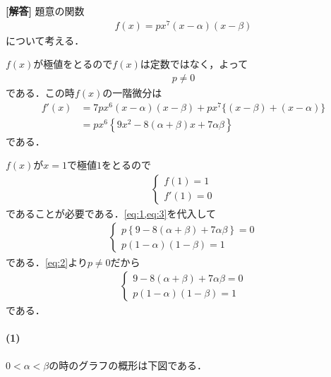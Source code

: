 \documentclass[../../main.tex]{subfiles}
\begin{document}
\begin{oframed}
  
\end{oframed}

{\bf [解答]}
題意の関数
\begin{align}
  f(x) = px^7(x-\alpha)(x-\beta) \label{eq:1}
\end{align}
について考える．

$f(x)$が極値をとるので$f(x)$は定数ではなく，よって
\begin{align}
  p \neq 0 \label{eq:2}
\end{align}
である．この時$f(x)$の一階微分は
\begin{align}
  f'(x)
  &=7px^6(x-\alpha)(x-\beta)+px^7\{(x-\beta)+(x-\alpha)\} \\
  &=px^6\left\{9x^2-8(\alpha+\beta)x+7\alpha\beta\right\} \label{eq:3}
\end{align}
である．

$f(x)$が$x=1$で極値$1$をとるので
\begin{align}
  \begin{cases}
    f(1) = 1 \\
    f'(1) = 0
  \end{cases}
\end{align}
であることが必要である．\cref{eq:1,eq:3}を代入して
\begin{align}
  \begin{cases}
    p\left\{9-8(\alpha+\beta)+7\alpha\beta\right\}=0 \\
    p(1-\alpha)(1-\beta)=1
  \end{cases}
\end{align}
である．\cref{eq:2}より$p\neq 0$だから
\begin{align}
  \begin{cases}
    9-8(\alpha+\beta)+7\alpha\beta=0 \\
    p(1-\alpha)(1-\beta)=1
  \end{cases} \label{eq:4}
\end{align}
である．

\paragraph{(1)}

$0<\alpha<\beta$の時のグラフの概形は下図である．
\end{document}
